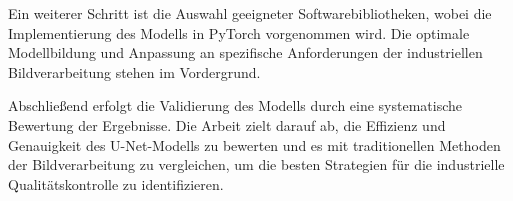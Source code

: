 Ein weiterer Schritt ist die Auswahl geeigneter Softwarebibliotheken, wobei die Implementierung des Modells in PyTorch vorgenommen wird. Die optimale Modellbildung und Anpassung an spezifische Anforderungen der industriellen Bildverarbeitung stehen im Vordergrund.

Abschließend erfolgt die Validierung des Modells durch eine systematische Bewertung der Ergebnisse. Die Arbeit zielt darauf ab, die Effizienz und Genauigkeit des U-Net-Modells zu bewerten und es mit traditionellen Methoden der Bildverarbeitung zu vergleichen, um die besten Strategien für die industrielle Qualitätskontrolle zu identifizieren.
